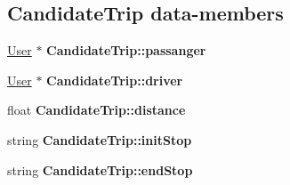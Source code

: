 \subsection*{Candidate\+Trip data-\/members}
\begin{DoxyCompactItemize}
\item 
\mbox{\label{group___candidate_trip_ga077aa0bd535c7d0f9b3a75128e532d9f}} 
\hyperlink{class_user}{User} $\ast$ {\bfseries Candidate\+Trip\+::passanger}
\item 
\mbox{\label{group___candidate_trip_ga9ab3832a411c7521a0ca2d13addd2c73}} 
\hyperlink{class_user}{User} $\ast$ {\bfseries Candidate\+Trip\+::driver}
\item 
\mbox{\label{group___candidate_trip_ga25c418f6847fffb3172af3e08a1f9ffb}} 
float {\bfseries Candidate\+Trip\+::distance}
\item 
\mbox{\label{group___candidate_trip_gabe433e5b373a047b9e8e25e76735faf9}} 
string {\bfseries Candidate\+Trip\+::init\+Stop}
\item 
\mbox{\label{group___candidate_trip_ga3b4924a6a48b125dcdaf430e94944efb}} 
string {\bfseries Candidate\+Trip\+::end\+Stop}
\end{DoxyCompactItemize}
